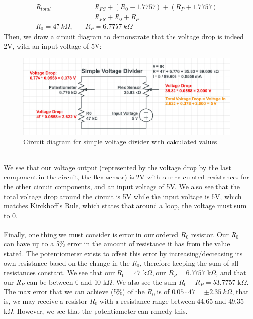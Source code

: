 \documentclass[12pt, a4paper]{article}
\begin{document}
\begin{enumerate}
\begin{align*}
R_{total} &= R_{FS} + (R_0 -1.7757) + (R_P+1.7757) \\
 &= R_{FS} + R_0 + R_P\\ 
 R_0 = 47\ k\Omega, \quad& R_P = 6.7757\ k\Omega
\end{align*}
Then, we draw a circuit diagram to demonstrate that the voltage drop is indeed 2V, with an input voltage of 5V: \\
\begin{figure}[h]
\centering
\includegraphics[width=1\textwidth]{samp6}
\caption{Circuit diagram for simple voltage divider with calculated values}
\end{figure}
\\
We see that our voltage output (represented by the voltage drop by the last component in the circuit, the flex sensor) is 2V with our calculated resistances for the other circuit components, and an input voltage of 5V. We also see that the total voltage drop around the circuit is 5V while the input voltage is 5V, which matches Kirckhoff's Rule, which states that around a loop, the voltage must sum to 0. \\ \\
Finally, one thing we must consider is error in our ordered $R_0$ resistor. Our $R_0$ can have up to a 5$\%$ error in the amount of resistance it has from the value stated. The potentiometer exists to offset this error by increasing/decreasing its own resistance based on the change in the $R_0$, therefore keeping the sum of all resistances constant. We see that our $R_0 = 47$  k$\Omega$, our $R_P = 6.7757$  k$\Omega$, and that our $R_P$ can be between 0 and 10  k$\Omega$. We also see the sum $R_0 + R_P = 53.7757$ k$\Omega$. The max error that we can achieve (5\%) of the $R_0$ is of $0.05 \cdot 47 =  \pm 2.35 \ k\Omega$, that is, we may receive a resistor $R_0$ with a resistance range between 44.65 and 49.35  k$\Omega$. However, we see that the potentiometer can remedy this. \\ \\

\end{enumerate}
\end{document}
